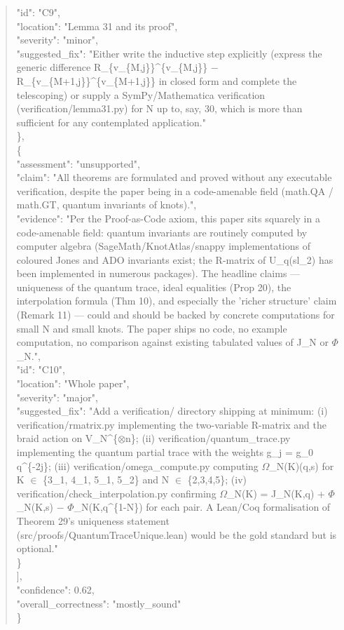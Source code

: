 \documentclass[11pt]{article}
\begin{document}
\begin{quote}
      "id": "C9",\\
      "location": "Lemma 31 and its proof",\\
      "severity": "minor",\\
      "suggested\_fix": "Either write the inductive step explicitly (express the generic difference R\_\{v\_\{M,j\}\}\^{}\{v\_\{M,j\}\} \ensuremath{-} R\_\{v\_\{M+1,j\}\}\^{}\{v\_\{M+1,j\}\} in closed form and complete the telescoping) or supply a SymPy/Mathematica verification (verification/lemma31.py) for N up to, say, 30, which is more than sufficient for any contemplated application."\\
    \},\\
    \{\\
      "assessment": "unsupported",\\
      "claim": "All theorems are formulated and proved without any executable verification, despite the paper being in a code-amenable field (math.QA / math.GT, quantum invariants of knots).",\\
      "evidence": "Per the Proof-as-Code axiom, this paper sits squarely in a code-amenable field: quantum invariants are routinely computed by computer algebra (SageMath/KnotAtlas/snappy implementations of coloured Jones and ADO invariants exist; the R-matrix of U\_q(sl\_2) has been implemented in numerous packages). The headline claims --- uniqueness of the quantum trace, ideal equalities (Prop 20), the interpolation formula (Thm 10), and especially the 'richer structure' claim (Remark 11) --- could and should be backed by concrete computations for small N and small knots. The paper ships no code, no example computation, no comparison against existing tabulated values of J\_N or \ensuremath{\Phi}\_N.",\\
      "id": "C10",\\
      "location": "Whole paper",\\
      "severity": "major",\\
      "suggested\_fix": "Add a verification/ directory shipping at minimum: (i) verification/rmatrix.py implementing the two-variable R-matrix and the braid action on V\_N\^{}\{\ensuremath{\otimes}n\}; (ii) verification/quantum\_trace.py implementing the quantum partial trace with the weights g\_j = g\_0 q\^{}\{-2j\}; (iii) verification/omega\_compute.py computing \ensuremath{\Omega}\_N(K)(q,s) for K \ensuremath{\in} \{3\_1, 4\_1, 5\_1, 5\_2\} and N \ensuremath{\in} \{2,3,4,5\}; (iv) verification/check\_interpolation.py confirming \ensuremath{\Omega}\_N(K) = J\_N(K,q) + \ensuremath{\Phi}\_N(K,s) \ensuremath{-} \ensuremath{\Phi}\_N(K,q\^{}\{1-N\}) for each pair. A Lean/Coq formalisation of Theorem 29's uniqueness statement (src/proofs/QuantumTraceUnique.lean) would be the gold standard but is optional."\\
    \}\\
  ],\\
  "confidence": 0.62,\\
  "overall\_correctness": "mostly\_sound"\\
\}\\
\end{quote}
\end{document}

